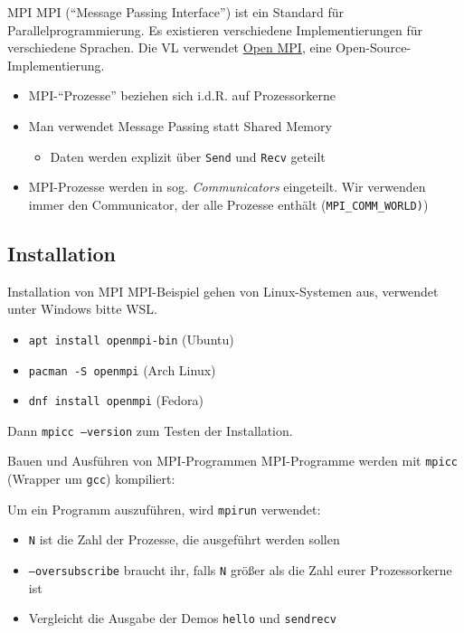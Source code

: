 \documentclass{beamer}
\newcommand{\code}[1]{
	\begin{mdframed}
		
	\end{mdframed}
}
\begin{document}
\begin{frame}{MPI}
	MPI (\enquote{Message Passing Interface}) ist ein Standard für Parallelprogrammierung.
	Es existieren verschiedene Implementierungen für verschiedene Sprachen.
	Die VL verwendet \href{https://www.open-mpi.org/}{Open MPI}, eine Open-Source-Implementierung.

	\begin{itemize}
		\item MPI-\enquote{Prozesse} beziehen sich i.d.R. auf Prozessorkerne
		\item Man verwendet Message Passing statt Shared Memory
		\begin{itemize}
			\item Daten werden explizit über \texttt{Send} und \texttt{Recv} geteilt
		\end{itemize}
		\item MPI-Prozesse werden in sog. \emph{Communicators} eingeteilt. Wir verwenden immer den Communicator, der alle Prozesse enthält (\texttt{MPI_COMM_WORLD)})
	\end{itemize}
\end{frame}

\subsection{Installation}

\begin{frame}{Installation von MPI}
	MPI-Beispiel gehen von Linux-Systemen aus, verwendet unter Windows bitte WSL.

	\begin{itemize}
		\item \texttt{apt install openmpi-bin} (Ubuntu)
		\item \texttt{pacman -S openmpi} (Arch Linux)
		\item \texttt{dnf install openmpi} (Fedora)
	\end{itemize}

	Dann \texttt{mpicc --version} zum Testen der Installation.
\end{frame}

\begin{frame}{Bauen und Ausführen von MPI-Programmen}
	MPI-Programme werden mit \texttt{mpicc} (Wrapper um \texttt{gcc}) kompiliert:

	\code{code/mpicompile.sh}

	Um ein Programm auszuführen, wird \texttt{mpirun} verwendet:

	\code{code/mpirun.sh}

	\begin{itemize}
		\item \texttt{N} ist die Zahl der Prozesse, die ausgeführt werden sollen
		\item \texttt{--oversubscribe} braucht ihr, falls \texttt{N} größer als die Zahl eurer Prozessorkerne ist
		\item Vergleicht die Ausgabe der Demos \texttt{hello} und \texttt{sendrecv}
	\end{itemize}
\end{frame}
\end{document}
